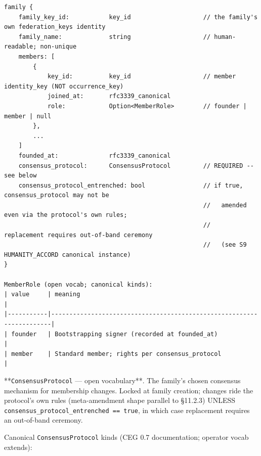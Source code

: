 \documentclass[11pt]{article}
\begin{document}
\begin{lstlisting}
family {
    family_key_id:           key_id                    // the family's own federation_keys identity
    family_name:             string                    // human-readable; non-unique
    members: [
        {
            key_id:          key_id                    // member identity_key (NOT occurrence_key)
            joined_at:       rfc3339_canonical
            role:            Option<MemberRole>        // founder | member | null
        },
        ...
    ]
    founded_at:              rfc3339_canonical
    consensus_protocol:      ConsensusProtocol         // REQUIRED -- see below
    consensus_protocol_entrenched: bool                // if true, consensus_protocol may not be
                                                       //   amended even via the protocol's own rules;
                                                       //   replacement requires out-of-band ceremony
                                                       //   (see S9 HUMANITY_ACCORD canonical instance)
}

MemberRole (open vocab; canonical kinds):
| value     | meaning                                                              |
|-----------|----------------------------------------------------------------------|
| founder   | Bootstrapping signer (recorded at founded_at)                        |
| member    | Standard member; rights per consensus_protocol                       |
\end{lstlisting}

**\texttt{ConsensusProtocol} — open vocabulary**. The family's chosen consensus mechanism for membership changes. Locked at family creation; changes ride the protocol's own rules (meta-amendment shape parallel to §11.2.3) UNLESS \texttt{consensus\_protocol\_entrenched == true}, in which case replacement requires an out-of-band ceremony.


Canonical \texttt{ConsensusProtocol} kinds (CEG 0.7 documentation; operator vocab extends):
\end{document}

